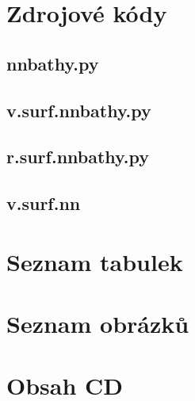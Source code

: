 \documentclass[12pt,a4paper]{article}
\begin{document}
\section{Zdrojové kódy}
\subsection{nnbathy.py}
\label{app:nnbathy}


\bigskip
\subsection{v.surf.nnbathy.py}
\label{app:v.surf}


\newpage
\subsection{r.surf.nnbathy.py}
\label{app:r.surf}


\subsection{v.surf.nn}
\label{app:v.surf.nn}


\newpage
\section{Seznam tabulek}
\listoftables

\section{Seznam obrázků}
\listoffigures

\section{Obsah CD}
\end{document}
